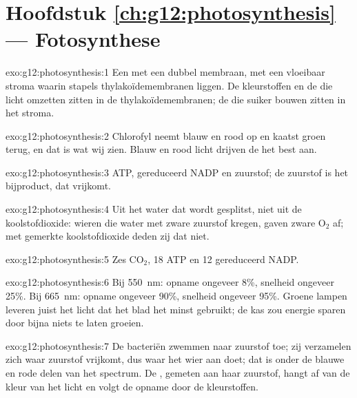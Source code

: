 \section*{Hoofdstuk \ref{ch:g12:photosynthesis} --- Fotosynthese}

\begin{solution}{exo:g12:photosynthesis:1}
Een  met een dubbel membraan, met een vloeibaar stroma waarin
stapels thylakoïdemembranen liggen. De kleurstoffen en de  die
licht omzetten zitten in de thylakoïdemembranen; de  die suiker
bouwen zitten in het stroma.
\end{solution}

\begin{solution}{exo:g12:photosynthesis:2}
Chlorofyl neemt blauw en rood op en kaatst groen terug, en dat is wat wij
zien. Blauw en rood licht drijven de  het best aan.
\end{solution}

\begin{solution}{exo:g12:photosynthesis:3}
ATP, gereduceerd NADP en zuurstof; de zuurstof is het bijproduct, dat vrijkomt.
\end{solution}

\begin{solution}{exo:g12:photosynthesis:4}
Uit het water dat wordt gesplitst, niet uit de koolstofdioxide: wieren die
water met zware zuurstof kregen, gaven zware $\mathrm{O_2}$ af; met
gemerkte koolstofdioxide deden zij dat niet.
\end{solution}

\begin{solution}{exo:g12:photosynthesis:5}
Zes $\mathrm{CO_2}$, 18 ATP en 12 gereduceerd NADP.
\end{solution}

\begin{solution}{exo:g12:photosynthesis:6}
Bij \qty{550}{nm}: opname ongeveer 8\%, snelheid ongeveer 25\%. Bij
\qty{665}{nm}: opname ongeveer 90\%, snelheid ongeveer 95\%. Groene lampen
leveren juist het licht dat het blad het minst gebruikt; de kas zou
energie sparen door bijna niets te laten groeien.
\end{solution}

\begin{solution}{exo:g12:photosynthesis:7}
De bacteriën zwemmen naar zuurstof toe; zij verzamelen zich waar zuurstof
vrijkomt, dus waar het wier aan  doet; dat is onder de blauwe
en rode delen van het spectrum. De , gemeten aan haar
zuurstof, hangt af van de kleur van het licht en volgt de opname door de
kleurstoffen.
\end{solution}

